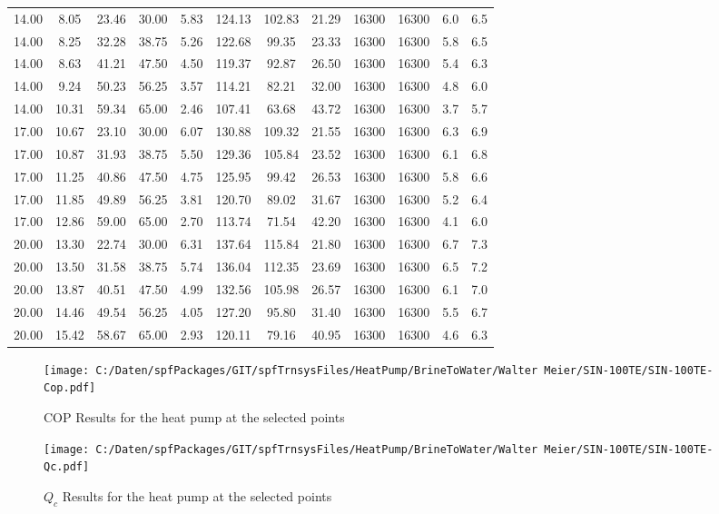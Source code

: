 \documentclass[english]{SPFShortReport}
\begin{document}
\begin{table}[!ht]
\begin{small}
\begin{center}
{\begin{tabular}{l | c c c c c c c c c c c }
14.00 & 8.05 & 23.46 & 30.00 & 5.83 & 124.13 & 102.83 & 21.29 & 16300 & 16300 & 6.0 & 6.5\\ 
14.00 & 8.25 & 32.28 & 38.75 & 5.26 & 122.68 & 99.35 & 23.33 & 16300 & 16300 & 5.8 & 6.5\\ 
14.00 & 8.63 & 41.21 & 47.50 & 4.50 & 119.37 & 92.87 & 26.50 & 16300 & 16300 & 5.4 & 6.3\\ 
14.00 & 9.24 & 50.23 & 56.25 & 3.57 & 114.21 & 82.21 & 32.00 & 16300 & 16300 & 4.8 & 6.0\\ 
14.00 & 10.31 & 59.34 & 65.00 & 2.46 & 107.41 & 63.68 & 43.72 & 16300 & 16300 & 3.7 & 5.7\\ 
17.00 & 10.67 & 23.10 & 30.00 & 6.07 & 130.88 & 109.32 & 21.55 & 16300 & 16300 & 6.3 & 6.9\\ 
17.00 & 10.87 & 31.93 & 38.75 & 5.50 & 129.36 & 105.84 & 23.52 & 16300 & 16300 & 6.1 & 6.8\\ 
17.00 & 11.25 & 40.86 & 47.50 & 4.75 & 125.95 & 99.42 & 26.53 & 16300 & 16300 & 5.8 & 6.6\\ 
17.00 & 11.85 & 49.89 & 56.25 & 3.81 & 120.70 & 89.02 & 31.67 & 16300 & 16300 & 5.2 & 6.4\\ 
17.00 & 12.86 & 59.00 & 65.00 & 2.70 & 113.74 & 71.54 & 42.20 & 16300 & 16300 & 4.1 & 6.0\\ 
20.00 & 13.30 & 22.74 & 30.00 & 6.31 & 137.64 & 115.84 & 21.80 & 16300 & 16300 & 6.7 & 7.3\\ 
20.00 & 13.50 & 31.58 & 38.75 & 5.74 & 136.04 & 112.35 & 23.69 & 16300 & 16300 & 6.5 & 7.2\\ 
20.00 & 13.87 & 40.51 & 47.50 & 4.99 & 132.56 & 105.98 & 26.57 & 16300 & 16300 & 6.1 & 7.0\\ 
20.00 & 14.46 & 49.54 & 56.25 & 4.05 & 127.20 & 95.80 & 31.40 & 16300 & 16300 & 5.5 & 6.7\\ 
20.00 & 15.42 & 58.67 & 65.00 & 2.93 & 120.11 & 79.16 & 40.95 & 16300 & 16300 & 4.6 & 6.3\\ 
\hline
\hline
\end{tabular}
}
\label{ResultsTable}
\end{center}
\end{small}
\end{table}
\begin{figure}[!ht]
\begin{center}
\texttt{[image: C:/Daten/spfPackages/GIT/spfTrnsysFiles/HeatPump/BrineToWater/Walter Meier/SIN-100TE/SIN-100TE-Cop.pdf]}
\caption{COP Results for the heat pump at the selected points}
\label{COPFig}
\end{center}
\end{figure}
\begin{figure}[!ht]
\begin{center}
\texttt{[image: C:/Daten/spfPackages/GIT/spfTrnsysFiles/HeatPump/BrineToWater/Walter Meier/SIN-100TE/SIN-100TE-Qc.pdf]}
\caption{$Q_c$ Results for the heat pump at the selected points}
\label{QcFig}
\end{center}
\end{figure}
\end{document}
